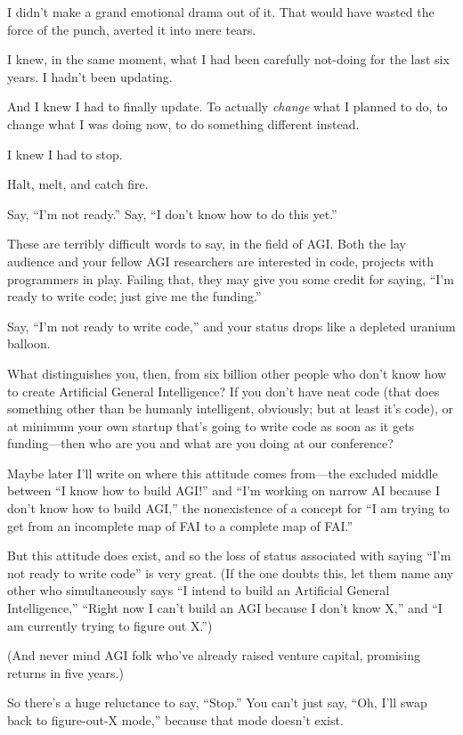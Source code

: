 {
 I didn't make a grand emotional drama out of it.
That would have wasted the force of the punch, averted it into mere
tears.}

{
 I knew, in the same moment, what I had been carefully not-doing
for the last six years. I hadn't been updating.}

{
 And I knew I had to finally update. To actually \textit{change}
what I planned to do, to change what I was doing now, to do something
different instead.}

{
 I knew I had to stop.}

{
 Halt, melt, and catch fire.}

{
 Say, ``I'm not
ready.'' Say, ``I
don't know how to do this yet.''}

{
 These are terribly difficult words to say, in the field of AGI.
Both the lay audience and your fellow AGI researchers are interested in
code, projects with programmers in play. Failing that, they may give
you some credit for saying, ``I'm
ready to write code; just give me the funding.''}

{
 Say, ``I'm not ready to write
code,'' and your status drops like a depleted uranium
balloon.}

{
 What distinguishes you, then, from six billion other people who
don't know how to create Artificial General
Intelligence? If you don't have neat code (that does
something other than be humanly intelligent, obviously; but at least
it's code), or at minimum your own startup
that's going to write code as soon as it gets
funding---then who are you and what are you doing at our conference?}

{
 Maybe later I'll write on where this attitude
comes from---the excluded middle between ``I know how
to build AGI!'' and
``I'm working on narrow AI because I
don't know how to build AGI,'' the
nonexistence of a concept for ``I am trying to get
from an incomplete map of FAI to a complete map of
FAI.''}

{
 But this attitude does exist, and so the loss of status associated
with saying ``I'm not ready to write
code'' is very great. (If the one doubts this, let
them name any other who simultaneously says ``I intend
to build an Artificial General Intelligence,''
``Right now I can't build an AGI
because I don't know X,'' and
``I am currently trying to figure out
X.'')}

{
 (And never mind AGI folk who've already raised
venture capital, promising returns in five years.)}

{
 So there's a huge reluctance to say,
``Stop.'' You can't
just say, ``Oh, I'll swap back to
figure-out-X mode,'' because that mode
doesn't exist.}

